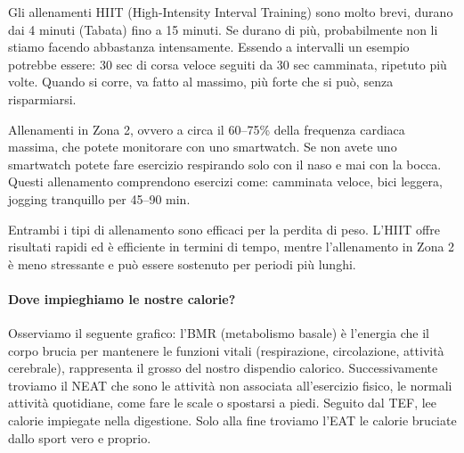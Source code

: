 \documentclass[12pt]{book} %
\begin{document}
Gli allenamenti HIIT (High-Intensity Interval Training) sono molto brevi, durano dai 4 minuti (Tabata) fino a 15 minuti. Se durano di più, probabilmente non li stiamo facendo abbastanza intensamente.
Essendo a intervalli un esempio potrebbe essere: 30 sec di corsa veloce seguiti da 30 sec camminata, ripetuto più volte. Quando si corre, va fatto al massimo, più forte che si può, senza risparmiarsi.

Allenamenti in Zona 2, ovvero a circa il 60–75\% della frequenza cardiaca massima, che potete monitorare con uno smartwatch. Se non avete uno smartwatch potete fare esercizio respirando solo con il naso e mai con la bocca. Questi allenamento comprendono esercizi come: camminata veloce, bici leggera, jogging tranquillo per 45–90 min.

Entrambi i tipi di allenamento sono efficaci per la perdita di peso. L'HIIT offre risultati rapidi ed è efficiente in termini di tempo, mentre l'allenamento in Zona 2 è meno stressante e può essere sostenuto per periodi più lunghi.

\paragraph{Dove impieghiamo le nostre calorie?}

Osserviamo il seguente grafico: l'BMR (metabolismo basale) è l'energia che il corpo brucia per mantenere le funzioni vitali (respirazione, circolazione, attività cerebrale), rappresenta il grosso del nostro dispendio calorico. Successivamente troviamo il NEAT che sono le attività non associata all'esercizio fisico, le normali attività quotidiane, come fare le scale o spostarsi a piedi. Seguito dal TEF, lee calorie impiegate nella digestione. Solo alla fine troviamo l'EAT le calorie bruciate dallo sport vero e proprio.

\begin{figure}
\centering
{}
\end{figure}
\end{document}

